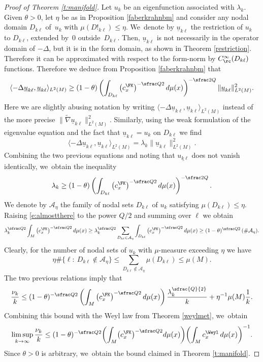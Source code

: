 \begin{proof}[Proof of Theorem \ref{t:manifold}]
Let $u_k$ be an eigenfunction associated with $\lambda_k$. Given \hbox{$\theta>0$}, let $\eta$ be as in Proposition \ref{faberkrahnbm} and consider any nodal domain $D_{k\ell}$ of~$u_k$ with \hbox{$\mu(D!_{k\ell})\leq\eta$}. We~denote by $\underline{u}_{k\ell}$ the restriction of $u_k$ to $D_{k\ell}$, extended by~$0$ out\-side~$D_{k\ell}$. Then, $\underline{u}_{k\ell}$ is not necessarily in the operator domain of $-\Delta$, but it is in the form domain, as shown in Theorem \ref{restriction}. Therefore it can be approximated with respect to the form-norm by $C^\infty_\rc(D_{k\ell})$ functions. Therefore we deduce from Proposition \ref{faberkrahnbm} that
\[
\langle -\Delta \underline{u}_{k\ell},\underline{u}_{k\ell}\rangle_{L^2(M)}
\geq (1-\theta) \left(\int_{D_{k\ell}} \left(c_x^\FK\right)^{-\sfrac Q2} d\mu(x)\right)^{-\sfrac 2Q} \| \underline{u}_{k\ell} \|_{L^2(M)}^2.
\]
Here we are slightly abusing notation by writing $\langle -\Delta \underline{u}_{k\ell},\underline{u}_{k\ell}\rangle_{L^2(M)}$ instead of the more precise $\| \tilde \nabla \underline{u}_{k\ell}\|^2_{L^2(M)}$. Similarly, using the weak formulation of the eigenvalue equation and the fact that $\underline{u}_{k\ell}=u_k$ on $D_{k\ell}$ we find
\[
\langle -\Delta \underline{u}_{k\ell},\underline{u}_{k\ell}\rangle_{L^2(M)} = \lambda_k \|\underline{u}_{k\ell}\|_{L^2(M)}^{2}.
\]
Combining the two previous equations and noting that $\underline{u_{k\ell}}$ does not vanish identically, we~obtain the inequality
\begin{equation}\label{e:almostthere}
\lambda_k \geq (1-\theta) \left(\int_{D_{k\ell}} \left(c_x^\FK\right)^{-\sfrac Q2} d\mu(x)\right)^{-\sfrac 2Q}.
\end{equation}
We denote by $\mathcal A_\eta$ the family of nodal sets $D_{k\ell}$ of $u_k$ satisfying $\mu(D_{k\ell})\leq \eta$. Raising \eqref{e:almostthere} to the power $Q/2$ and summing over $\ell$ we obtain
\[
\lambda_k^{\sfrac Q2} \int_M \left(c_x^\FK\right)^{-\sfrac Q2} d\mu(x)
\geq \lambda_k^{\sfrac Q2} \sum_{D_{k\ell}\in \mathcal{A}_\eta} \int_{D_{k\ell}} \left(c_x^\FK\right)^{-\sfrac Q2} d\mu(x) \geq (1-\theta)^{\sfrac Q2} \,(\#\mathcal{A}_\eta).
\]
Clearly, for the number of nodal sets of $u_k$ with $\mu$-measure exceeding $\eta$ we have
\[
\eta \#\{ \ell:\ D_{k\ell}\not\in \mathcal A_\eta \} \leq \sum_{D_{k\ell}\not\in \mathcal{A}_\eta} \mu(D_{k\ell}) \leq \mu(M).
\]
The two previous relations imply that
\[
\frac{\nu_k}{k} \leq (1-\theta)^{-\sfrac Q2} \left(\int_M \left(c_x^\FK\right)^{-\sfrac Q2} d\mu(x)\right) \frac{\lambda_k^{\sfrac{Q}{2}}}{k} + \eta^{-1} \mu(M) \frac{1}{k}.
\]
Combining this bound with the Weyl law from Theorem \ref{weylmet}, we~obtain
\[
\limsup_{k\to\infty} \frac{\nu_k}{k}\leq (1-\theta)^{-\sfrac Q2} \biggl(\int_M\bigl(c_x^\FK\bigr)^{-\sfrac Q2} d\mu(x) \biggr) \biggl(\int_M c_x^\Weyl \,d\mu(x) \biggr)^{-1}.
\]
Since $\theta>0$ is arbitrary, we~obtain the bound claimed in Theorem \ref{t:manifold}.
\end{proof}

